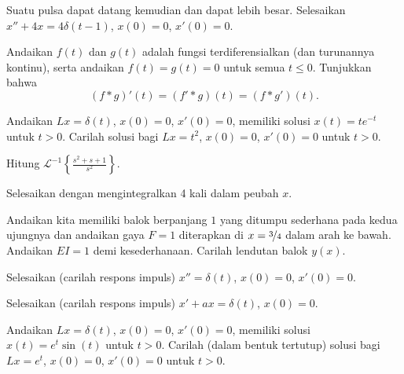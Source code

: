 \begin{exercise}
Suatu pulsa dapat datang kemudian dan dapat lebih besar.
Selesaikan 
$x'' + 4 x = 4\delta(t-1)$, $x(0) = 0$, $x'(0)=0$.
\end{exercise}

\begin{exercise}
Andaikan $f(t)$ dan $g(t)$ adalah fungsi terdiferensialkan
(dan turunannya kontinu),
serta andaikan $f(t) = g(t) = 0$ untuk semua $t \leq 0$.  Tunjukkan bahwa
\begin{equation*}
(f * g)'(t) = (f' * g)(t) = (f * g')(t) .
\end{equation*}
\end{exercise}

\begin{exercise}
Andaikan $L x = \delta(t)$, $x(0) = 0$, $x'(0) = 0$, memiliki solusi
$x(t) = t e^{-t}$ untuk $t > 0$.  Carilah solusi bagi
$Lx = t^2$, $x(0) = 0$, $x'(0) = 0$ untuk $t > 0$.
\end{exercise}

\begin{exercise}
Hitung
${\mathcal{L}}^{-1} \left\{ \frac{s^2+s+1}{s^2} \right\}$.
\end{exercise}

\begin{exercise}[menantang]
Selesaikan  dengan mengintegralkan 4 kali dalam peubah $x$.
\end{exercise}

\begin{exercise}
Andaikan kita memiliki balok berpanjang $1$ yang ditumpu sederhana pada kedua ujungnya dan
andaikan gaya $F=1$ diterapkan di $x=\nicefrac{3}{4}$ dalam arah
ke bawah.  Andaikan $EI=1$ demi kesederhanaan.  Carilah lendutan balok
$y(x)$.
\end{exercise}

\setcounter{exercise}{100}

\begin{exercise}
Selesaikan (carilah respons impuls)
$x'' = \delta(t)$, $x(0) = 0$, $x'(0)=0$.
\end{exercise}

\begin{exercise}
Selesaikan (carilah respons impuls)
$x' + a x = \delta(t)$, $x(0) = 0$.
\end{exercise}

\begin{exercise}
Andaikan $L x = \delta(t)$, $x(0) = 0$, $x'(0) = 0$, memiliki solusi
$x(t) = e^t \sin(t)$ untuk $t > 0$.  Carilah (dalam bentuk tertutup) solusi bagi
$Lx = e^t$, $x(0) = 0$, $x'(0) = 0$ untuk $t > 0$.
\end{exercise}

